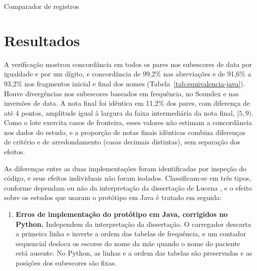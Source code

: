 \begin{chapter}{Comparador de registros}
\section{Resultados}\label{sec:e1-resultados}

A verificação mostrou concordância em todos os pares nos subescores de data por igualdade e por um dígito, e concordância de 99,2\% nas abreviações e de 91,6\% a 93,2\% nos fragmentos inicial e final dos nomes (Tabela~\ref{tab:equivalencia-java}). Houve divergências nos subescores baseados em frequência, no Soundex e nas inversões de data. A nota final foi idêntica em 11,2\% dos pares, com diferença de até 4 pontos, amplitude igual à largura da faixa intermediária da nota final, $[5,9)$. Como o lote exercita casos de fronteira, esses valores não estimam a concordância nos dados do estudo, e a proporção de notas finais idênticas combina diferenças de critério e de arredondamento (casas decimais distintas), sem separação dos efeitos.



As diferenças entre as duas implementações foram identificadas por inspeção do código, e seus efeitos individuais não foram isolados. Classificam-se em três tipos, conforme dependam ou não da interpretação da dissertação de Lucena \citeyearpar{Lucena2013algoritmos}, e o efeito sobre os estudos que usaram o protótipo em Java é tratado em seguida:

\begin{enumerate}
\item \textbf{Erros de implementação do protótipo em Java, corrigidos no Python.} Independem da interpretação da dissertação. O carregador descarta a primeira linha e inverte a ordem das tabelas de frequência, e um contador sequencial desloca os escores do nome da mãe quando o nome do paciente está ausente. No Python, as linhas e a ordem das tabelas são preservadas e as posições dos subescores são fixas.


\end{enumerate}
\end{chapter}
